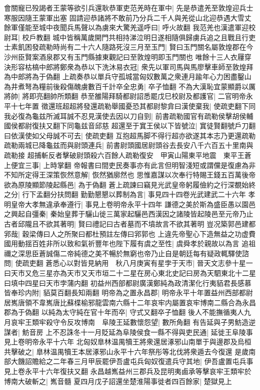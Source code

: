 會關寵已殁謁者王蒙等欲引兵還耿恭軍吏范羌時在軍中|{
	先是恭遣羌至敦煌迎兵士寒服因隨王蒙軍出塞}
固請迎恭諸將不敢前乃分兵二千人與羌從山北迎恭遇大雪丈餘軍僅能至城中夜聞兵馬聲以為虜來大驚羌遥呼曰|{
	呼火故翻}
我范羌也漢遣軍迎校尉耳|{
	校戶教翻}
城中皆稱萬歲開門共相持涕泣明日遂相隨俱歸虜兵追之且戰且行吏士素飢困發疏勒時尚有二十六人隨路死沒三月至玉門|{
	賢曰玉門關名屬敦煌郡在今沙州臣賢案酒泉郡又有玉門縣據東觀記曰至敦煌明即玉門關也}
唯餘十三人衣屨穿決形容枯槁中郎將鄭衆為恭以下洗沐易衣冠|{
	衆先以軍司馬與馬廖擊車師至敦煌拜為中郎將為于偽翻}
上疏奏恭以單兵守孤城當匈奴數萬之衆連月踰年心力困盡鑿山為井煮弩為糧前後殺傷醜虜數百千計卒全忠勇|{
	卒子恤翻}
不為大漢恥宜蒙顯爵以厲將帥|{
	將即亮翻帥所類翻}
恭至雒陽拜騎都尉詔悉罷戊巳校尉及都護官|{
	二官明帝永平十七年置}
徵還班超超將發還疏勒舉國憂恐其都尉黎弇曰漢使棄我|{
	使疏吏翻下同}
我必復為龜兹所滅耳誠不忍見漢使去因以刀自剄|{
	前書疏勒國官有疏勒侯擊胡侯輔國侯都尉復扶又翻下同龜兹音邱慈}
超還至于窴王侯以下皆號泣|{
	窴徒賢翻號戶刀翻}
曰依漢使如父母誠不可去|{
	使疏吏翻}
互抱超馬脚不得行超亦欲遂其本志乃更還疏勒疏勒兩城已降龜兹而與尉頭連兵|{
	前書尉頭國居尉頭谷去長安八千六百五十里南與疏勒接}
超捕斬反者擊破尉頭殺六百餘人疏勒復安　甲寅山陽東平地震　東平王蒼上便宜三事|{
	上時掌翻}
帝報書曰間吏民奏事亦有此言但明智淺短或謂儻是復慮為非不知所定得王深策恢然意解|{
	恢然猶廓然也}
思惟嘉謀以次奉行特賜王錢五百萬後帝欲為原陵顯節陵起縣邑|{
	為于偽翻}
蒼上疏諫曰竊見光武皇帝躬履儉約之行深覩始終之分|{
	行下孟翻分扶問翻}
勤勤懇懇以葬制為言|{
	事見四十四卷光武建武二十六年}
孝明皇帝大孝無違承奉遵行|{
	事見上卷明帝永平十四年}
謙德之美於斯為盛臣愚以園邑之興起自彊秦|{
	秦始皇葬于驪山徙三萬家起驪邑西漢因之諸陵皆起陵邑至元帝乃止}
古者邱隴且不欲其著明|{
	賢曰禮記曰古者墓而不墳故言不欲其著明}
豈况築郭邑建都郛哉|{
	穀梁傳曰人之所聚曰都杜預註左傳曰郛郭也}
上違先帝聖心下造無益之功虚費國用動揺百姓非所以致和氣祈豐年也陛下履有虞之至性|{
	虞舜孝於親故以為言}
追祖禰之深思臣蒼誠傷二帝純德之美不暢於無窮也帝乃止自是朝廷每有疑政輒驛使諮問|{
	使疏吏翻}
蒼悉心以對皆見納用　秋八月庚寅有星孛于天市|{
	晉天文志參十星一曰天市又危三星亦為天市又天市垣二十二星在房心東北史記曰房為天駟東北十二星曰填中四星曰天市孛蒲内翻}
初益州西部都尉廣漢鄭純為政清潔化行夷貊君長感慕皆奉珍内附|{
	貊莫百翻長知兩翻}
明帝為之置永昌郡|{
	明帝永平十年置益州西部都尉居嶲唐領不韋嶲唐比蘇楪榆邪龍雲南六縣十二年哀牢内屬置哀牢博南二縣合為永昌郡為于偽翻}
以純為太守純在官十年而卒|{
	守式又翻卒子恤翻}
後人不能撫循夷人九月哀牢王類牢殺守令反攻博南　阜陵王延數懷怨望|{
	數所角翻}
有告延與子男魴造逆謀者|{
	魴音房}
上不忍誅冬十一月貶延為阜陵侯食一縣不得與吏民通|{
	延徙王阜陵事見上卷明帝永平十六年}
北匈奴臯林温禺犢王將衆還居涿邪山南單于與邊郡及烏桓共擊破之|{
	臯林温禺犢王本居涿邪山永平十六年祭彤等北伐將衆遁去今復還}
是歲南部大饑詔贍給之二年春三月甲辰罷伊吾盧屯兵匈奴復遣兵守其地|{
	伊吾盧置屯兵事見上卷永平十六年復扶又翻}
永昌越嶲益州三郡兵及昆明夷鹵承等擊哀牢王類牢於博南大破斬之|{
	嶲音髓}
夏四月戊子詔還坐楚淮陽事徙者四百餘家|{
	楚獄見上}


